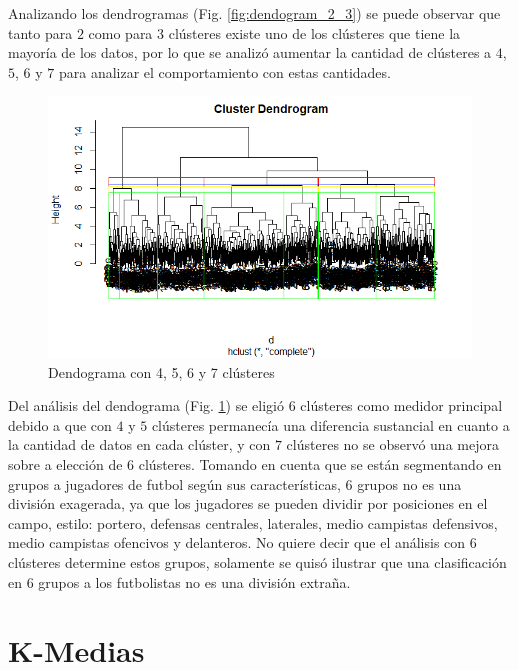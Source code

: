 \documentclass[a4paper,10pt,twocolumn]{article}
\begin{document}
Analizando los dendrogramas (Fig. \ref{fig:dendogram_2_3}) se puede observar que tanto para $2$ como para $3$ clústeres existe uno de los clústeres que tiene la mayoría de los datos, por lo que se analizó aumentar la cantidad de clústeres a $4$, $5$, $6$ y $7$ para analizar el comportamiento con estas cantidades.

\begin{figure}[htb]%
	\begin{center}
		\includegraphics[width=\linewidth]{dendogram_4_7}
	\end{center}
	\caption{Dendograma con 4, 5, 6 y 7 clústeres \label{fig:dendogram_4_7}}%
\end{figure}

Del análisis del dendograma (Fig. \ref{fig:dendogram_4_7}) se eligió $6$ clústeres como medidor principal debido a que con $4$ y $5$ clústeres permanecía una diferencia sustancial en cuanto a la cantidad de datos en cada clúster, y con $7$ clústeres no se observó una mejora sobre a elección de $6$ clústeres. Tomando en cuenta que se están segmentando en grupos a jugadores de futbol según sus características, $6$ grupos no es una división exagerada, ya que los jugadores se pueden dividir por posiciones en el campo, estilo: portero, defensas centrales, laterales, medio campistas defensivos, medio campistas ofencivos y delanteros. No quiere decir que el análisis con $6$ clústeres determine estos grupos, solamente se quisó ilustrar que una clasificación en $6$ grupos a los futbolistas no es una división extraña.

\section{K-Medias}\label{sec:kmeans}
\end{document}
